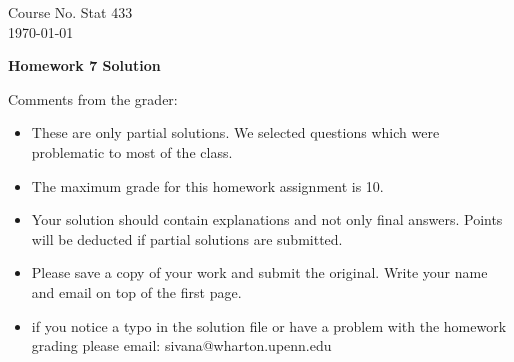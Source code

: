 \documentclass[10pt,a4paper]{article}
\begin{document}
\begin{flushleft}
Course No. Stat 433 \\
\today
\end{flushleft}

\begin{center}
{\Large{\bf  Homework 7 Solution}}
\end{center}

\textcolor[rgb]{0.98,0.00,0.00}{Comments from the grader:}
\begin{itemize}

    \item \textcolor[rgb]{0.98,0.00,0.00}{These are only partial solutions.  We selected
    questions which were problematic to most of the class.}
    \item \textcolor[rgb]{0.98,0.00,0.00}{The maximum grade for this homework assignment is 10.}
    \item \textcolor[rgb]{0.98,0.00,0.00}{Your solution should contain explanations and not only
    final answers. Points will be deducted if partial solutions
    are submitted.}
    \item \textcolor[rgb]{0.98,0.00,0.00}{Please save a copy of your work and submit the original.
    Write your name and email on top of the first page.}
    \item \textcolor[rgb]{0.98,0.00,0.00}{if you notice a typo in the solution file or have a problem with the homework
    grading please email: sivana@wharton.upenn.edu
}
\end{itemize}
\end{document}
